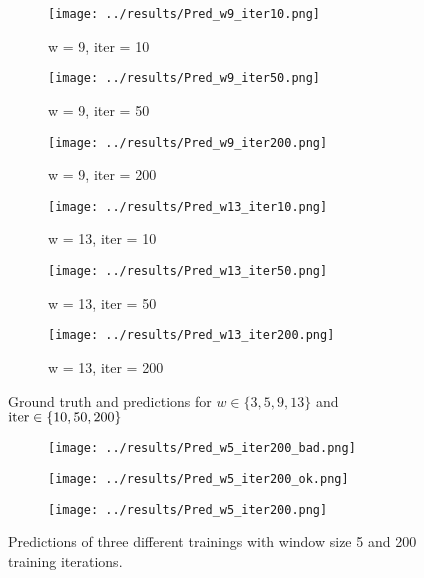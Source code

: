 \documentclass{article}
\begin{document}
\begin{figure}
    \begin{subfigure}[t]{0.3\textwidth}
        \centering
        \texttt{[image: ../results/Pred\_w9\_iter10.png]}
        \caption{w = 9, iter = 10}
    \end{subfigure}
    \begin{subfigure}[t]{0.3\textwidth}
        \centering
        \texttt{[image: ../results/Pred\_w9\_iter50.png]}
        \caption{w = 9, iter = 50}
    \end{subfigure}
    \begin{subfigure}[t]{0.3\textwidth}
        \centering
        \texttt{[image: ../results/Pred\_w9\_iter200.png]}
        \caption{w = 9, iter = 200}
    \end{subfigure}

    \begin{subfigure}[t]{0.3\textwidth}
        \centering
        \texttt{[image: ../results/Pred\_w13\_iter10.png]}
        \caption{w = 13, iter = 10}
    \end{subfigure}
    \begin{subfigure}[t]{0.3\textwidth}
        \centering
        \texttt{[image: ../results/Pred\_w13\_iter50.png]}
        \caption{w = 13, iter = 50}
    \end{subfigure}    
    \begin{subfigure}[t]{0.3\textwidth}
        \centering
        \texttt{[image: ../results/Pred\_w13\_iter200.png]}
        \caption{w = 13, iter = 200}
    \end{subfigure}
    
    \caption{Ground truth and predictions for $w \in \{3,5,9,13\}$ and $\textnormal{iter} \in \{10, 50, 200\}$}

\end{figure}
\begin{figure}
\centering

	\begin{subfigure}[b]{0.3\textwidth}
		\centering    
        \texttt{[image: ../results/Pred\_w5\_iter200\_bad.png]}
    \end{subfigure}
	\begin{subfigure}[b]{0.3\textwidth}
		\centering    
        \texttt{[image: ../results/Pred\_w5\_iter200\_ok.png]}
    \end{subfigure}
	\begin{subfigure}[b]{0.3\textwidth}
		\centering    
        \texttt{[image: ../results/Pred\_w5\_iter200.png]}
    \end{subfigure}
    
    \caption{Predictions of three different trainings with window size 5 and 200 training iterations.}
    
\end{figure}
\end{document}
